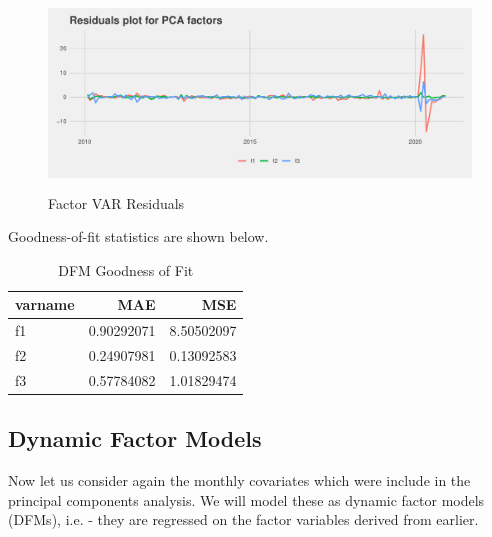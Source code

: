 \documentclass[11pt, letterpaper]{article}\usepackage[]{graphicx}\usepackage[]{color}
\begin{document}
\begin{figure}[H]

{\centering \includegraphics[width=5in,height=2in]{figure/unnamed-chunk-11-1} 

}

\caption[Factor VAR Residuals]{Factor VAR Residuals}\label{fig:unnamed-chunk-11}
\end{figure}



Goodness-of-fit statistics are shown below.
\begin{table}[H]
\centering
\begingroup\footnotesize
\begin{tabular}{lrr}
  \hline
varname & MAE & MSE \\ 
  \hline
f1 & 0.90292071 & 8.50502097 \\ 
  f2 & 0.24907981 & 0.13092583 \\ 
  f3 & 0.57784082 & 1.01829474 \\ 
   \hline
\end{tabular}
\endgroup
\caption{DFM Goodness of Fit} 
\end{table}




\subsection{Dynamic Factor Models}
Now let us consider again the monthly covariates which were include in the principal components analysis. We will model these as dynamic factor models (DFMs), i.e. - they are regressed on the factor variables derived from earlier.
\end{document}

